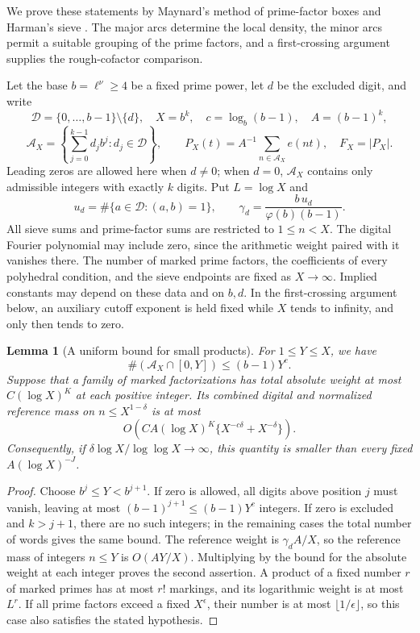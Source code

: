 \documentclass[11pt,a4paper]{article}
\theoremstyle{paperplain}
\newtheorem{lemma}[theorem]{Lemma}
\numberwithin{equation}{section}
\begin{document}
We prove these statements by Maynard's method of prime-factor boxes and
Harman's sieve \cite{Maynard2019,Harman2007}. The major arcs determine the
local density, the minor arcs permit a suitable grouping of the prime
factors, and a first-crossing argument supplies the rough-cofactor comparison.

Let the base $b=\ell^\nu\ge4$ be a fixed prime power, let $d$ be the excluded
digit, and write
\[
 \mathcal D=\{0,\ldots,b-1\}\setminus\{d\},\quad
 X=b^k,\quad c=\log_b(b-1),\quad A=(b-1)^k,
\]
\[
 \mathcal A_X=\left\{\sum_{j=0}^{k-1}d_jb^j:d_j\in\mathcal D\right\},
 \qquad P_X(t)=A^{-1}\sum_{n\in\mathcal A_X}e(nt),\quad F_X=|P_X|.
\]
Leading zeros are allowed here when $d\ne0$; when $d=0$, $\mathcal A_X$
contains only admissible integers with exactly $k$ digits. Put $L=\log X$
and
\begin{equation}\label{arith:localfactor}
 u_d=\#\{a\in\mathcal D:(a,b)=1\},\qquad
 \gamma_d=\frac{b\,u_d}{\varphi(b)(b-1)}.
\end{equation}
All sieve sums and prime-factor sums are restricted to $1\le n<X$.
The digital Fourier polynomial may include zero, since the arithmetic
weight paired with it vanishes there.
The number of marked prime factors, the coefficients of every polyhedral
condition, and the sieve endpoints are fixed as $X\to\infty$.
Implied constants may depend on these data and on $b,d$.
In the first-crossing argument below, an auxiliary cutoff exponent is
held fixed while $X$ tends to infinity, and only then tends to zero.

\begin{lemma}[A uniform bound for small products]\label{arith:small}
For $1\le Y\le X$, we have
\[
 \#(\mathcal A_X\cap[0,Y])\le(b-1)Y^c.
\]
Suppose that a family of marked factorizations has total absolute weight
at most $C(\log X)^K$ at each positive integer. Its combined digital and
normalized reference mass on $n\le X^{1-\delta}$ is at most
\begin{equation}\label{arith:small-bound}
 O\left(CA(\log X)^K
       \{X^{-c\delta}+X^{-\delta}\}\right).
\end{equation}
Consequently, if $\delta\log X/\log\log X\to\infty$, this quantity is
smaller than every fixed $A(\log X)^{-J}$.
\end{lemma}
\begin{proof}
Choose $b^j\le Y<b^{j+1}$. If zero is allowed, all digits above position
$j$ must vanish, leaving at most $(b-1)^{j+1}\le(b-1)Y^c$ integers.
If zero is excluded and $k>j+1$, there are no such integers; in the
remaining cases the total number of words gives the same bound.
The reference weight is $\gamma_d A/X$, so the reference mass of integers
$n\le Y$ is $O(AY/X)$. Multiplying by the bound for the absolute weight
at each integer proves the second assertion.
A product of a fixed number $r$ of marked primes has at most $r!$
markings, and its logarithmic weight is at most $L^r$. If all prime
factors exceed a fixed $X^\epsilon$, their number is at most
$\lfloor1/\epsilon\rfloor$, so this case also satisfies the stated
hypothesis.
\end{proof}
\end{document}
